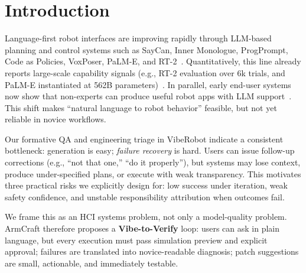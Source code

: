 \documentclass[sigconf,review,anonymous]{acmart}
\begin{document}
\maketitle

\section{Introduction}
Language-first robot interfaces are improving rapidly through LLM-based planning and control systems such as SayCan, Inner Monologue, ProgPrompt, Code as Policies, VoxPoser, PaLM-E, and RT-2~\cite{ahn2022saycan,huang2022innermonologue,singh2022progprompt,liang2023codeaspolicies,huang2023voxposer,driess2023palme,brohan2023rt2}. Quantitatively, this line already reports large-scale capability signals (e.g., RT-2 evaluation over 6k trials, and PaLM-E instantiated at 562B parameters)~\cite{brohan2023rt2,driess2023palme}. In parallel, early end-user systems now show that non-experts can produce useful robot apps with LLM support~\cite{karli2024alchemist,ge2024cocobo}. This shift makes ``natural language to robot behavior'' feasible, but not yet reliable in novice workflows.

Our formative QA and engineering triage in VibeRobot indicate a consistent bottleneck: generation is easy; \emph{failure recovery} is hard. Users can issue follow-up corrections (e.g., ``not that one,'' ``do it properly''), but systems may lose context, produce under-specified plans, or execute with weak transparency. This motivates three practical risks we explicitly design for: low success under iteration, weak safety confidence, and unstable responsibility attribution when outcomes fail.

We frame this as an HCI systems problem, not only a model-quality problem. ArmCraft therefore proposes a \textbf{Vibe-to-Verify} loop: users can ask in plain language, but every execution must pass simulation preview and explicit approval; failures are translated into novice-readable diagnosis; patch suggestions are small, actionable, and immediately testable.
\end{document}
